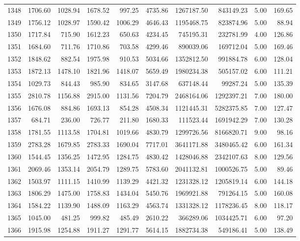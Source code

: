 \begin{tabular}{lrrrrrrrrr}
1348 & 1706.60 & 1028.94 & 1678.52 & 997.25 & 4735.86 & 1267187.50 & 843149.23 & 5.00 & 169.65 \\
1349 & 1756.12 & 1028.97 & 1590.42 & 1006.29 & 4646.43 & 1195468.75 & 823874.96 & 5.00 & 88.94 \\
1350 & 1717.84 & 715.90 & 1612.23 & 650.63 & 4234.45 & 745195.31 & 232781.99 & 4.00 & 126.86 \\
1351 & 1684.60 & 711.76 & 1710.86 & 703.58 & 4299.46 & 890039.06 & 169712.04 & 5.00 & 169.46 \\
1352 & 1848.62 & 882.54 & 1975.98 & 910.53 & 5034.66 & 1352812.50 & 991884.78 & 6.00 & 128.04 \\
1353 & 1872.13 & 1478.10 & 1821.96 & 1418.07 & 5659.49 & 1980234.38 & 505157.02 & 6.00 & 111.21 \\
1354 & 1029.73 & 844.43 & 985.90 & 834.65 & 3147.68 & 637148.44 & 99287.24 & 5.00 & 135.39 \\
1355 & 2810.78 & 1156.88 & 2915.00 & 1131.56 & 7204.79 & 2468164.06 & 1292397.21 & 7.00 & 180.00 \\
1356 & 1676.08 & 884.86 & 1693.13 & 854.28 & 4508.34 & 1121445.31 & 5282375.85 & 7.00 & 127.47 \\
1357 & 684.71 & 236.00 & 726.77 & 211.80 & 1680.33 & 111523.44 & 1691942.29 & 7.00 & 130.28 \\
1358 & 1781.55 & 1113.58 & 1704.81 & 1019.66 & 4830.79 & 1299726.56 & 8166820.71 & 9.00 & 98.16 \\
1359 & 2783.28 & 1679.85 & 2783.33 & 1690.04 & 7717.01 & 3641171.88 & 3480465.42 & 6.00 & 161.34 \\
1360 & 1544.45 & 1356.25 & 1472.95 & 1284.75 & 4830.42 & 1428046.88 & 2342107.63 & 8.00 & 129.56 \\
1361 & 2069.46 & 1353.14 & 2054.79 & 1289.75 & 5783.60 & 2041132.81 & 1000526.75 & 5.00 & 89.46 \\
1362 & 1503.97 & 1111.15 & 1410.99 & 1139.29 & 4421.32 & 1231328.12 & 1205819.14 & 6.00 & 144.18 \\
1363 & 1806.29 & 1475.00 & 1758.83 & 1434.04 & 5450.76 & 1969921.88 & 791264.15 & 5.00 & 160.08 \\
1364 & 1584.22 & 1139.90 & 1488.09 & 1163.29 & 4563.74 & 1331328.12 & 1178236.45 & 8.00 & 118.17 \\
1365 & 1045.00 & 481.25 & 999.82 & 485.49 & 2610.22 & 366289.06 & 1034425.71 & 6.00 & 97.20 \\
1366 & 1915.98 & 1254.88 & 1911.27 & 1291.77 & 5614.15 & 1882734.38 & 549186.41 & 5.00 & 138.49 \\

\end{tabular}
